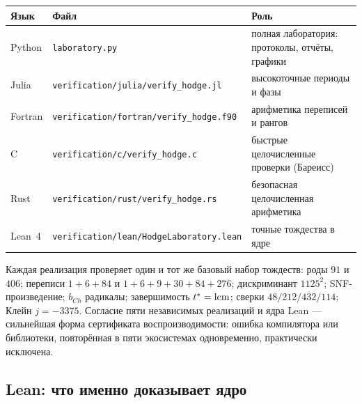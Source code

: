 \begin{center}
\small
\begin{tabularx}{\textwidth}{@{}l l >{\raggedright\arraybackslash}X@{}}
\toprule
Язык & Файл & Роль \\
\midrule
Python & \texttt{laboratory.py} & полная лаборатория: протоколы,
отчёты, графики \\
Julia & \texttt{verification/julia/verify\_hodge.jl} &
высокоточные периоды и фазы \\
Fortran & \texttt{verification/fortran/verify\_hodge.f90} &
арифметика переписей и рангов \\
C & \texttt{verification/c/verify\_hodge.c} & быстрые целочисленные
проверки (Бареисс) \\
Rust & \texttt{verification/rust/verify\_hodge.rs} & безопасная
целочисленная арифметика \\
Lean~4 & \texttt{verification/lean/HodgeLaboratory.lean} & точные
тождества в ядре \\
\bottomrule
\end{tabularx}
\end{center}

Каждая реализация проверяет один и тот же базовый набор тождеств:
роды $91$ и $406$; переписи $1+6+84$ и $1+6+9+30+84+276$;
дискриминант $1125^2$; SNF-произведение; $b_{Ch}$ радикалы;
завершимость $t^*=\operatorname{lcm}$; сверки $48/212/432/114$; Клейн $j=-3375$.
Согласие пяти независимых реализаций и ядра Lean --- сильнейшая форма
сертификата воспроизводимости: ошибка компилятора или библиотеки,
повторённая в пяти экосистемах одновременно, практически исключена.

\subsection{Lean: что именно доказывает ядро}

